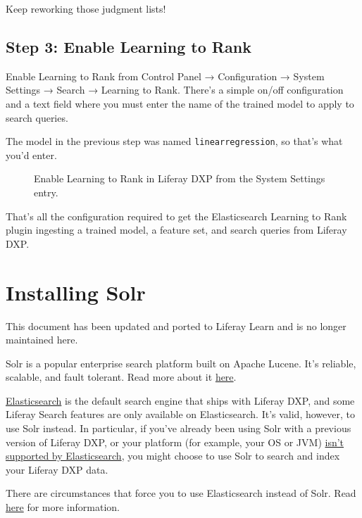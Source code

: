 Keep reworking those judgment lists!

\section{Step 3: Enable Learning to
Rank}\label{step-3-enable-learning-to-rank}

Enable Learning to Rank from Control Panel → Configuration → System
Settings → Search → Learning to Rank. There's a simple on/off
configuration and a text field where you must enter the name of the
trained model to apply to search queries.

The model in the previous step was named \texttt{linearregression}, so
that's what you'd enter.

\begin{figure}
\centering
{}
\caption{Enable Learning to Rank in Liferay DXP from the System Settings
entry.}
\end{figure}

That's all the configuration required to get the Elasticsearch Learning
to Rank plugin ingesting a trained model, a feature set, and search
queries from Liferay DXP.

\chapter{Installing Solr}\label{installing-solr}

{This document has been updated and ported to Liferay Learn and is no
longer maintained here.}

Solr is a popular enterprise search platform built on Apache Lucene.
It's reliable, scalable, and fault tolerant. Read more about it
\href{http://lucene.apache.org/solr/}{here}.

\href{/docs/7-2/deploy/-/knowledge_base/d/configuring-the-liferay-elasticsearch-connector}{Elasticsearch}
is the default search engine that ships with Liferay DXP, and some
Liferay Search features are only available on Elasticsearch. It's valid,
however, to use Solr instead. In particular, if you've already been
using Solr with a previous version of Liferay DXP, or your platform (for
example, your OS or JVM)
\href{https://www.elastic.co/support/matrix}{isn't supported by
Elasticsearch}, you might choose to use Solr to search and index your
Liferay DXP data.

There are circumstances that force you to use Elasticsearch instead of
Solr. Read
\href{/docs/7-2/deploy/-/knowledge_base/d/installing-a-search-engine\#choosing-a-search-engine}{here}
for more information.

